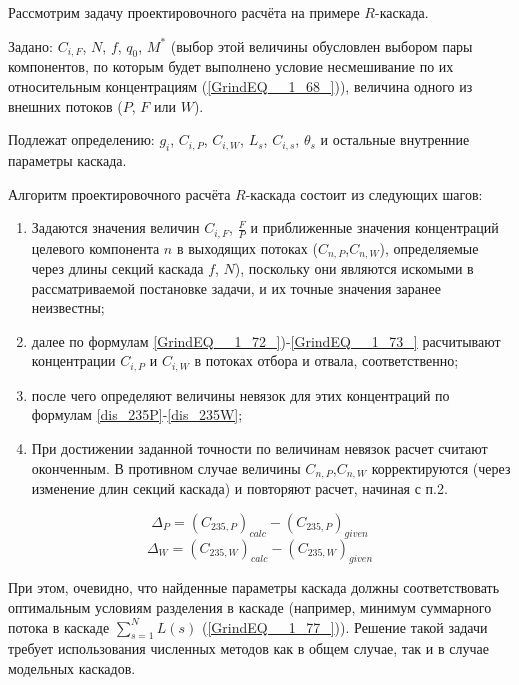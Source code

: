 Рассмотрим задачу проектировочного расчёта на примере $R$-каскада. 

Задано: $C_{i,F}$, $N$, $f$, $q_0$, $M^{*}$ (выбор этой величины обусловлен выбором пары компонентов, по которым будет выполнено условие несмешивание по их относительным концентрациям (\ref{GrindEQ__1_68_})), величина одного из внешних потоков ($P$, $F$ или $W$).

Подлежат определению: $g_i$, $C_{i,P}$, $C_{i,W}$, $L_{s}$, $C_{i, s}$, $\theta_{s}$ и остальные внутренние параметры каскада. 

Алгоритм проектировочного расчёта $R$-каскада состоит из следующих шагов:

\begin{enumerate}
  \item Задаются значения величин $C_{i,F}$, $\frac{F}{P}$ и приближенные значения концентраций целевого компонента $n$ в выходящих потоках ($C_{n,P}$,$C_{n,W}$), определяемые через длины секций каскада $f$, $N$), поскольку они являются искомыми в рассматриваемой постановке задачи, и их точные значения заранее неизвестны;
  \item далее по формулам \ref{GrindEQ__1_72_})-\ref{GrindEQ__1_73_} расчитывают концентрации $C_{i,P}$ и $C_{i,W}$ в потоках отбора и отвала, соответственно;
  \item после чего определяют величины невязок для этих концентраций по формулам \ref{dis_235P}-\ref{dis_235W};
  \item При достижении заданной точности по величинам невязок расчет считают оконченным. В противном случае величины $C_{n,P}$,$C_{n,W}$ корректируются (через изменение длин секций каскада) и повторяют расчет, начиная с п.2.
\end{enumerate}

\begin{equation}
  \label{dis_235P}
  \Delta_{P} = {(C_{235, P})}_{calc}-{(C_{235, P})}_{given}
\end{equation}
\begin{equation}
  \label{dis_235W}
  \Delta_{W} = {(C_{235, W})}_{calc}-{(C_{235, W})}_{given}
\end{equation}

При этом, очевидно, что найденные параметры каскада должны соответствовать оптимальным условиям разделения в каскаде (например, минимум суммарного потока в каскаде $\sum _{s=1}^{N}L(s)$ (\ref{GrindEQ__1_77_})). Решение такой задачи требует использования численных методов как в общем случае, так и в случае модельных каскадов. 

